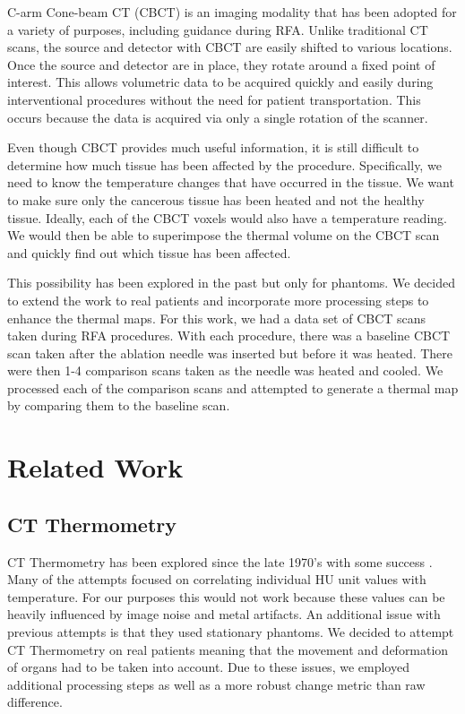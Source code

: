 \documentclass[]{spie}  %
\begin{document}
C-arm Cone-beam CT (CBCT) is an imaging modality that has been adopted for a variety of purposes\cite{Orth08}, including guidance during RFA. Unlike traditional CT scans, the source and detector with CBCT are easily shifted to various locations. Once the source and detector are in place, they rotate around a fixed point of interest. This allows volumetric data to be acquired quickly and easily during interventional procedures without the need for patient transportation. This occurs because the data is acquired via only a single rotation of the scanner.

Even though CBCT provides much useful information, it is still difficult to determine how much tissue has been affected by the procedure. Specifically, we need to know the temperature changes that have occurred in the tissue\cite{Li13}. We want to make sure only the cancerous tissue has been heated and not the healthy tissue. Ideally, each of the CBCT voxels would also have a temperature reading. We would then be able to superimpose the thermal volume on the CBCT scan and quickly find out which tissue has been affected.

This possibility has been explored in the past \cite{Li13} but only for phantoms. We decided to extend the work to real patients and incorporate more processing steps to enhance the thermal maps. For this work, we had a data set of CBCT scans taken during RFA procedures. With each procedure, there was a baseline CBCT scan taken after the ablation needle was inserted but before it was heated. There were then 1-4 comparison scans taken as the needle was heated and cooled. We processed each of the comparison scans and attempted to generate a thermal map by comparing them to the baseline scan.

\section{Related Work}

\subsection{CT Thermometry}

CT Thermometry has been explored since the late 1970's with some success \cite{Fani14}. Many of the attempts focused on correlating individual HU unit values with temperature. For our purposes this would not work because these values can be heavily influenced by image noise and metal artifacts. An additional issue with previous attempts is that they used stationary phantoms. We decided to attempt CT Thermometry on real patients meaning that the movement and deformation of organs had to be taken into account. Due to these issues, we employed additional processing steps as well as a more robust change metric than raw difference.
\end{document}
